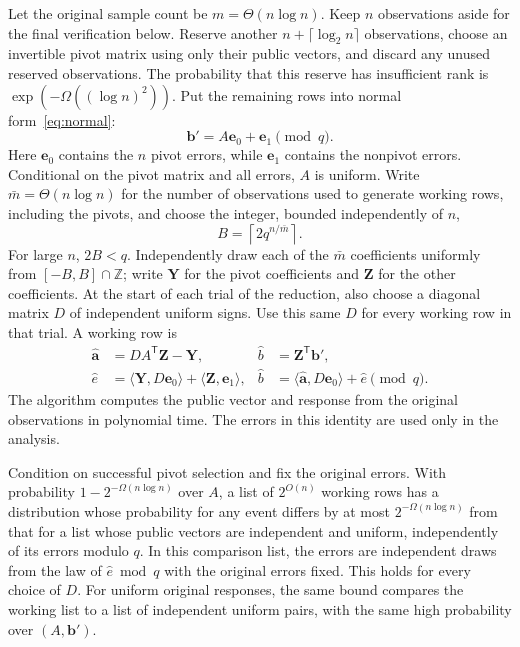 \documentclass[runningheads,envcountsame,envcountsect,orivec]{llncs}
\begin{document}
Let the original sample count be $m=\Theta(n\log n)$.
Keep $n$ observations aside for the final verification below.
Reserve another $n+\lceil\log_2 n\rceil$ observations, choose an invertible
pivot matrix using only their public vectors, and discard
any unused reserved observations. The probability that this
reserve has insufficient rank is $\exp(-\Omega((\log n)^2))$.
Put the remaining rows into normal form~\eqref{eq:normal}:
\[
 \boldsymbol b'=A\boldsymbol e_0+\boldsymbol e_1\pmod q.
\]
Here $\boldsymbol e_0$ contains the $n$ pivot errors, while
$\boldsymbol e_1$ contains the nonpivot errors. Conditional
on the pivot matrix and all errors, $A$ is uniform. Write
$\bar m=\Theta(n\log n)$ for the number of observations used
to generate working rows, including the pivots, and choose the
integer, bounded independently of $n$,
\[
 B=\left\lceil 2q^{n/\bar m}\right\rceil.
\]
For large $n$, $2B<q$. Independently draw each of the
$\bar m$ coefficients uniformly from $[-B,B]\cap\mathbb Z$;
write $\boldsymbol Y$ for the pivot coefficients and
$\boldsymbol Z$ for the other coefficients. At the start of
each trial of the reduction, also choose a diagonal matrix $D$
of independent uniform signs. Use this same $D$ for every
working row in that trial. A working row is
\begin{align}
 \widehat{\boldsymbol a}&=DA^{\mathsf T}\boldsymbol Z-\boldsymbol Y,
 &\widehat b&=\boldsymbol Z^{\mathsf T}\boldsymbol b',\nonumber\\
 \widehat e&=\langle\boldsymbol Y,D\boldsymbol e_0\rangle
                +\langle\boldsymbol Z,\boldsymbol e_1\rangle,
 &\widehat b&=\langle\widehat{\boldsymbol a},D\boldsymbol e_0\rangle
                  +\widehat e\pmod q.
 \label{eq:amplified-row}
\end{align}
The algorithm computes the public vector and response from
the original observations in polynomial time. The errors
in this identity are used only in the analysis.

\begin{lemma}
\label{lem:amplified-extraction}
Condition on successful pivot selection and fix the original
errors. With probability
$1-2^{-\Omega(n\log n)}$ over $A$, a list of $2^{O(n)}$
working rows has a distribution whose probability for any event
differs by at most $2^{-\Omega(n\log n)}$ from that for a list
whose public vectors
are independent and uniform, independently of its errors
modulo $q$. In this comparison list, the errors are independent
draws from the law of $\widehat e\bmod q$ with the original
errors fixed. This holds for every choice of $D$.
For uniform original responses, the same bound compares the
working list to a list of independent uniform pairs,
with the same high probability over $(A,\boldsymbol b')$.
\end{lemma}
\end{document}
